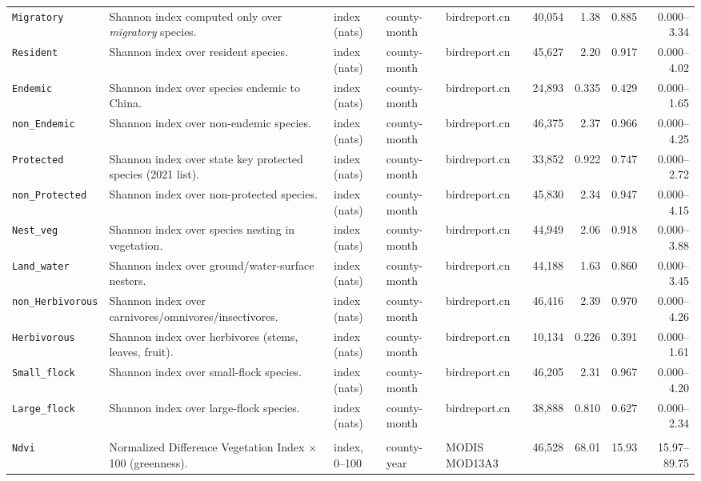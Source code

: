 \documentclass[10pt]{article}
\begin{document}
\begin{landscape}
{\begin{longtable}{>{\raggedright\arraybackslash}p{2.9cm}>{\raggedright\arraybackslash}p{8.0cm}>{\raggedright\arraybackslash}p{1.9cm}>{\raggedright\arraybackslash}p{1.7cm}>{\raggedright\arraybackslash}p{2.0cm}rrrr}
\texttt{Migratory} & Shannon index computed only over \emph{migratory} species. & index (nats) & county-month & birdreport.cn & 40,054 & 1.38 & 0.885 & 0.000--3.34\\
\texttt{Resident} & Shannon index over resident species. & index (nats) & county-month & birdreport.cn & 45,627 & 2.20 & 0.917 & 0.000--4.02\\
\texttt{Endemic} & Shannon index over species endemic to China. & index (nats) & county-month & birdreport.cn & 24,893 & 0.335 & 0.429 & 0.000--1.65\\
\texttt{non\_Endemic} & Shannon index over non-endemic species. & index (nats) & county-month & birdreport.cn & 46,375 & 2.37 & 0.966 & 0.000--4.25\\
\texttt{Protected} & Shannon index over state key protected species (2021 list). & index (nats) & county-month & birdreport.cn & 33,852 & 0.922 & 0.747 & 0.000--2.72\\
\texttt{non\_Protected} & Shannon index over non-protected species. & index (nats) & county-month & birdreport.cn & 45,830 & 2.34 & 0.947 & 0.000--4.15\\
\texttt{Nest\_veg} & Shannon index over species nesting in vegetation. & index (nats) & county-month & birdreport.cn & 44,949 & 2.06 & 0.918 & 0.000--3.88\\
\texttt{Land\_water} & Shannon index over ground/water-surface nesters. & index (nats) & county-month & birdreport.cn & 44,188 & 1.63 & 0.860 & 0.000--3.45\\
\texttt{non\_Herbivorous} & Shannon index over carnivores/omnivores/insectivores. & index (nats) & county-month & birdreport.cn & 46,416 & 2.39 & 0.970 & 0.000--4.26\\
\texttt{Herbivorous} & Shannon index over herbivores (stems, leaves, fruit). & index (nats) & county-month & birdreport.cn & 10,134 & 0.226 & 0.391 & 0.000--1.61\\
\texttt{Small\_flock} & Shannon index over small-flock species. & index (nats) & county-month & birdreport.cn & 46,205 & 2.31 & 0.967 & 0.000--4.20\\
\texttt{Large\_flock} & Shannon index over large-flock species. & index (nats) & county-month & birdreport.cn & 38,888 & 0.810 & 0.627 & 0.000--2.34\\
\midrule
\multicolumn{9}{l}{\rule{0pt}{12pt}\textbf{\color{jhublue}H. Mechanisms and wider consequences}}\\\midrule
\texttt{Ndvi} & Normalized Difference Vegetation Index $\times$100 (greenness). & index, 0--100 & county-year & MODIS MOD13A3 & 46,528 & 68.01 & 15.93 & 15.97--89.75\\

\end{longtable}}
\end{landscape}
\end{document}
